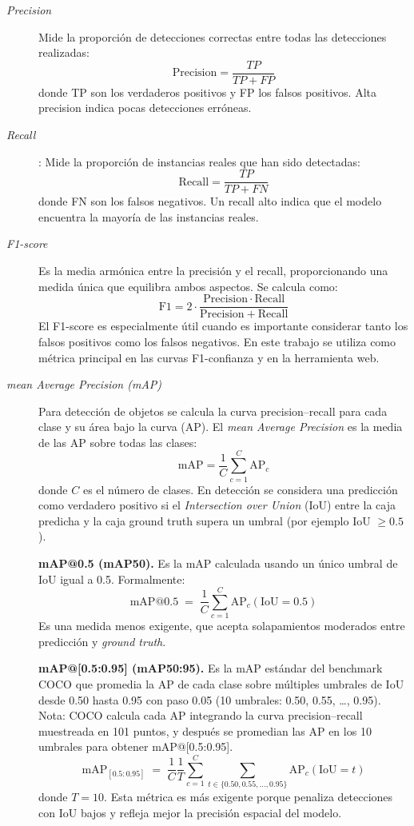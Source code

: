 \documentclass[12pt,a4paper,onecolumn,oneside]{report}
\begin{document}
\begin{description}
  \item[\textit{Precision}] Mide la proporción de detecciones correctas entre todas las detecciones realizadas:
  \[
    \mathrm{Precision} = \frac{TP}{TP + FP}
  \]
  donde TP son los verdaderos positivos y FP los falsos positivos. Alta precision indica pocas detecciones erróneas.

  \item[\textit{Recall}]: Mide la proporción de instancias reales que han sido detectadas:
  \[
    \mathrm{Recall} = \frac{TP}{TP + FN}
  \]
  donde FN son los falsos negativos. Un recall alto indica que el modelo encuentra la mayoría de las instancias reales.

  \item[\textit{F1-score}] Es la media armónica entre la precisión y el recall, proporcionando una medida única que equilibra ambos aspectos. Se calcula como:
  \[
    \mathrm{F1} = 2 \cdot \frac{\mathrm{Precision} \cdot \mathrm{Recall}}{\mathrm{Precision} + \mathrm{Recall}}
  \]
  El F1-score es especialmente útil cuando es importante considerar tanto los falsos positivos como los falsos negativos. En este trabajo se utiliza como métrica principal en las curvas F1-confianza y en la herramienta web.

  \item[\textit{mean Average Precision (mAP)}] Para detección de objetos se calcula la curva precision–recall para cada clase y su área bajo la curva (AP). El \textit{mean Average Precision} es la media de las AP sobre todas las clases:
  \[
    \mathrm{mAP} = \frac{1}{C}\sum_{c=1}^{C} \mathrm{AP}_c
  \]
  donde $C$ es el número de clases. En detección se considera una predicción como verdadero positivo si el \textit{Intersection over Union} (IoU) entre la caja predicha y la caja ground truth supera un umbral (por ejemplo IoU $\geq 0.5$). 

  \medskip

  \noindent\textbf{mAP@0.5 (mAP50).} Es la mAP calculada usando un único umbral de IoU igual a 0.5. Formalmente:
  \[
    \mathrm{mAP@0.5} \;=\; \frac{1}{C}\sum_{c=1}^{C} \mathrm{AP}_c(\mathrm{IoU}=0.5)
  \]
  Es una medida menos exigente, que acepta solapamientos moderados entre predicción y \textit{ground truth}.

  \medskip

  \noindent\textbf{mAP@[0.5:0.95] (mAP50:95).} Es la mAP estándar del benchmark COCO que promedia la AP de cada clase sobre múltiples umbrales de IoU desde 0.50 hasta 0.95 con paso 0.05 (10 umbrales: 0.50, 0.55, …, 0.95). Nota: COCO calcula cada AP integrando la curva precision–recall muestreada en 101 puntos, y después se promedian las AP en los 10 umbrales para obtener mAP@[0.5:0.95].
  \[
    \mathrm{mAP}_{[0.5:0.95]} \;=\; \frac{1}{C}\frac{1}{T}\sum_{c=1}^{C}\sum_{t\in\{0.50,0.55,\dots,0.95\}} \mathrm{AP}_c(\mathrm{IoU}=t)
  \]
  donde $T=10$. Esta métrica es más exigente porque penaliza detecciones con IoU bajos y refleja mejor la precisión espacial del modelo.


\end{description}
\end{document}
